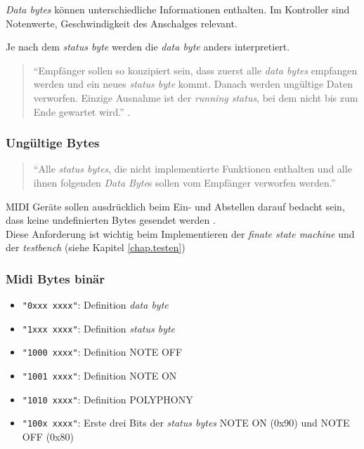 \textit{Data bytes} können unterschiedliche Informationen enthalten. Im Kontroller sind Notenwerte, Geschwindigkeit des Anschalges relevant.

Je nach dem \textit{status byte} werden die \textit{data byte} anders interpretiert. 

\begin{quote}
``Empfänger sollen so konzipiert sein, dass zuerst alle \textit{data bytes} empfangen werden und ein neues \textit{status byte} kommt. Danach werden ungültige Daten verworfen. Einzige Ausnahme ist der \textit{running status}, bei dem nicht bis zum Ende gewartet wird.'' \citep{Midi_specification}.
\end{quote}

\subsubsection*{Ungültige Bytes}

\begin{quote}
``Alle \textit{status bytes}, die nicht implementierte Funktionen enthalten und alle ihnen folgenden \textit{Data Byte}s sollen vom Empfänger verworfen werden.'' \citep{Midi_specification}
\end{quote}

MIDI Geräte sollen ausdrücklich beim Ein- und Abstellen darauf bedacht sein, dass keine undefinierten Bytes gesendet werden \citep{Midi_specification}.\\
Diese Anforderung ist wichtig beim Implementieren der \textit{finate state machine} und der \textit{testbench} (siehe Kapitel \ref{chap.testen})

\subsubsection*{Midi Bytes binär}\label{midi_binaer}

\begin{itemize}
	\item \lstinline|"0xxx xxxx"|: Definition \textit{data byte}
	\item \lstinline|"1xxx xxxx"|: Definition \textit{status byte}
	\item \lstinline|"1000 xxxx"|: Definition NOTE OFF
	\item \lstinline|"1001 xxxx"|: Definition NOTE ON
	\item \lstinline|"1010 xxxx"|: Definition POLYPHONY
	\item \lstinline|"100x xxxx"|: Erste drei Bits der \textit{status bytes} NOTE ON (0x90) und NOTE OFF (0x80)
\end{itemize}
\newpage

